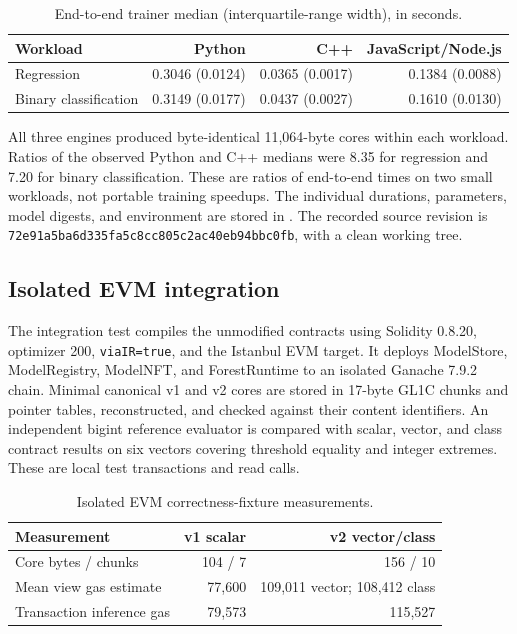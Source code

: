 \documentclass[10pt,a4paper]{article}
\theoremstyle{remark}
\begin{document}
\begin{table}[htbp]
\centering
\caption{End-to-end trainer median (interquartile-range width), in seconds.}
\label{tab:supp-trainer}
\begin{tabular}{lrrr}
\toprule
Workload & Python & C++ & JavaScript/Node.js\\
\midrule
Regression & 0.3046 (0.0124) & 0.0365 (0.0017) & 0.1384 (0.0088)\\
Binary classification & 0.3149 (0.0177) & 0.0437 (0.0027) & 0.1610 (0.0130)\\
\bottomrule
\end{tabular}
\end{table}

All three engines produced byte-identical 11,064-byte cores within each
workload. Ratios of the observed Python and C++ medians were 8.35 for
regression and 7.20 for binary classification. These are ratios of
end-to-end times on two small workloads, not portable training speedups.
The individual durations, parameters, model digests, and environment are
stored in . The recorded
source revision is
\nolinkurl{72e91a5ba6d335fa5c8cc805c2ac40eb94bbc0fb}, with a clean working tree.

\subsection{Isolated EVM integration}
\label{sec:supp-integration}

The integration test compiles the unmodified contracts using Solidity
0.8.20, optimizer 200, \texttt{viaIR=true}, and the Istanbul EVM target.
It deploys ModelStore, ModelRegistry, ModelNFT, and ForestRuntime to an
isolated Ganache 7.9.2 chain. Minimal canonical v1 and v2 cores are stored in
17-byte GL1C chunks and pointer tables, reconstructed, and checked against
their content identifiers. An independent bigint reference evaluator is
compared with scalar, vector, and class contract results on six vectors
covering threshold equality and integer extremes. These are local test
transactions and read calls.

\begin{table}[htbp]
\centering
\caption{Isolated EVM correctness-fixture measurements.}
\label{tab:supp-evm-correctness}
\begin{tabular}{lrr}
\toprule
Measurement & v1 scalar & v2 vector/class\\
\midrule
Core bytes / chunks & 104 / 7 & 156 / 10\\
Mean view gas estimate & 77,600 & 109,011 vector; 108,412 class\\
Transaction inference gas & 79,573 & 115,527\\
\bottomrule
\end{tabular}
\end{table}
\end{document}
